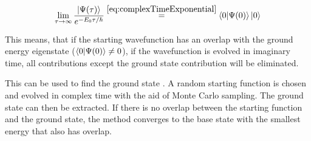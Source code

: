 \begin{equation}
    \label{eq:complexTimeApplication}
    \lim\limits_{\tau \rightarrow \infty}\frac{\ket{\Psi(\tau)}}{e^{-E_0 \tau / \hbar}} \stackrel{\ref{eq:complexTimeExponential}}{=} \bra{0}\ket{\Psi(0)} \ket{0}
\end{equation}

This means, that if the starting wavefunction has an overlap with the ground energy eigenstate ($\bra{0}\ket{\Psi(0)} \neq 0$), if the wavefunction is evolved in imaginary time, all contributions except the ground state contribution will be eliminated.

This can be used to find the ground state \cite{quantumMonteCarloSimulationsOfSolids}. A random starting function is chosen and evolved in complex time with the aid of Monte Carlo sampling. The ground state can then be extracted. If there is no overlap between the starting function and the ground state, the method converges to the base state with the smallest energy that also has overlap.